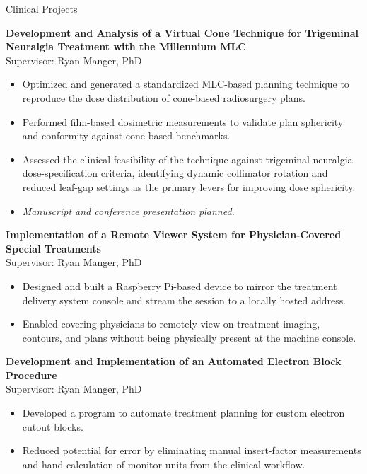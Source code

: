 \documentclass[
	11pt, %
]{resume} %
\begin{document}
\begin{rSection}{Clinical Projects}

	\textbf{Development and Analysis of a Virtual Cone Technique for Trigeminal Neuralgia Treatment with the Millennium MLC} \\
	Supervisor: Ryan Manger, PhD
	\vspace{-.2cm}
	\begin{itemize}[label=$\cdot$]
		\itemsep-0.5em
		\item Optimized and generated a standardized MLC-based planning technique to reproduce the dose distribution of cone-based radiosurgery plans.
		\item Performed film-based dosimetric measurements to validate plan sphericity and conformity against cone-based benchmarks.
		\item Assessed the clinical feasibility of the technique against trigeminal neuralgia dose-specification criteria, identifying dynamic collimator rotation and reduced leaf-gap settings as the primary levers for improving dose sphericity.
		\item \textit{Manuscript and conference presentation planned.}
	\end{itemize}

\newpage
	\textbf{Implementation of a Remote Viewer System for Physician-Covered Special Treatments} \\
	Supervisor: Ryan Manger, PhD
	\vspace{-.2cm}
	\begin{itemize}[label=$\cdot$]
		\itemsep-0.5em
		\item Designed and built a Raspberry Pi-based device to mirror the treatment delivery system console and stream the session to a locally hosted address.
		\item Enabled covering physicians to remotely view on-treatment imaging, contours, and plans without being physically present at the machine console.
	\end{itemize}

	\textbf{Development and Implementation of an Automated Electron Block Procedure} \\
	Supervisor: Ryan Manger, PhD
	\vspace{-.2cm}
	\begin{itemize}[label=$\cdot$]
		\itemsep-0.5em
		\item Developed a program to automate treatment planning for custom electron cutout blocks.
		\item Reduced potential for error by eliminating manual insert-factor measurements and hand calculation of monitor units from the clinical workflow.
	\end{itemize}


\end{rSection}
\end{document}
